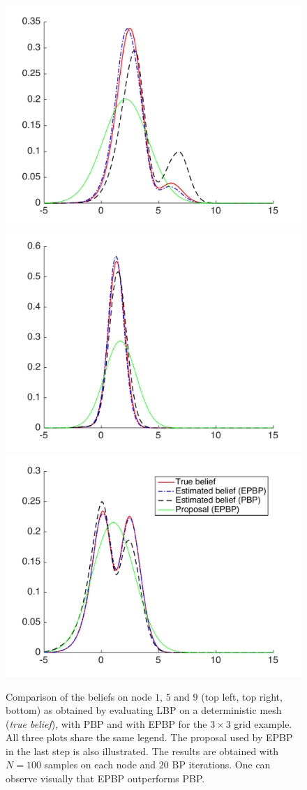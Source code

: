 \begin{figure}[!h]
\center
	\includegraphics[width=.48\textwidth]{figures/epbp/Gnode1}
	\includegraphics[width=.48\textwidth]{figures/epbp/Gnode5}
	\includegraphics[width=.48\textwidth]{figures/epbp/Gnode9}
\caption{\label{compEstBelGrid}Comparison of the beliefs on node $1$, $5$ and $9$ (top left, top right, bottom) as obtained by evaluating LBP on a deterministic mesh (\emph{true belief}), with PBP and with EPBP for the $3\times 3$ grid example. All three plots share the same legend. The proposal used by EPBP in the last step is also illustrated. The results are obtained with $N=100$ samples on each node and $20$ BP iterations. One can observe visually that EPBP outperforms PBP.}
\end{figure}

